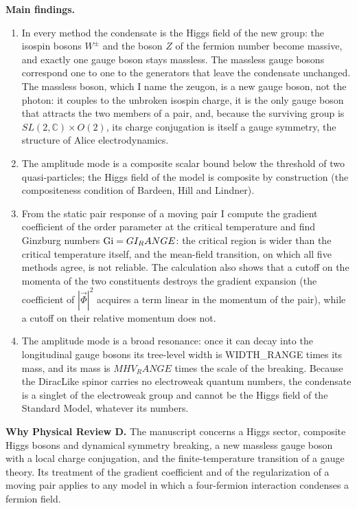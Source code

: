\documentclass[11pt]{article}
\begin{document}
\textbf{Main findings.}
\begin{enumerate}
\item In every method the condensate is the Higgs field of the new group: the isospin bosons $W^\pm$ and the boson $Z$ of
the fermion number become massive, and exactly one gauge boson stays massless. The massless gauge bosons correspond one to
one to the generators that leave the condensate unchanged. The massless boson, which I name the zeugon, is a new gauge
boson, not the photon: it couples to the unbroken isospin charge, it is the only gauge boson that attracts the two members
of a pair, and, because the surviving group is $SL(2,\mathbb C)\times O(2)$, its charge conjugation is itself a gauge
symmetry, the structure of Alice electrodynamics.
\item The amplitude mode is a composite scalar bound below the threshold of two quasi-particles; the Higgs field of the
model is composite by construction (the compositeness condition of Bardeen, Hill and Lindner).
\item From the static pair response of a moving pair I compute the gradient coefficient of the order parameter at the
critical temperature and find Ginzburg numbers ${\rm Gi}={{GI_RANGE}}$: the critical region is wider than the critical
temperature itself, and the mean-field transition, on which all five methods agree, is not reliable. The calculation also
shows that a cutoff on the momenta of the two constituents destroys the gradient expansion (the coefficient of
$|\vec\Phi|^2$ acquires a term linear in the momentum of the pair), while a cutoff on their relative momentum does not.
\item The amplitude mode is a broad resonance: once it can decay into the longitudinal gauge bosons its tree-level width is
{{WIDTH_RANGE}} times its mass, and its mass is ${{MHV_RANGE}}$ times the scale of the breaking. Because the DiracLike spinor
carries no electroweak quantum numbers, the condensate is a singlet of the electroweak group and cannot be the Higgs field
of the Standard Model, whatever its numbers.
\end{enumerate}

\textbf{Why Physical Review D.} The manuscript concerns a Higgs sector, composite Higgs bosons and dynamical symmetry
breaking, a new massless gauge boson with a local charge conjugation, and the finite-temperature transition of a gauge
theory. Its treatment of the gradient coefficient and of the regularization of a moving pair applies to any
model in which a four-fermion interaction condenses a fermion field.
\end{document}
